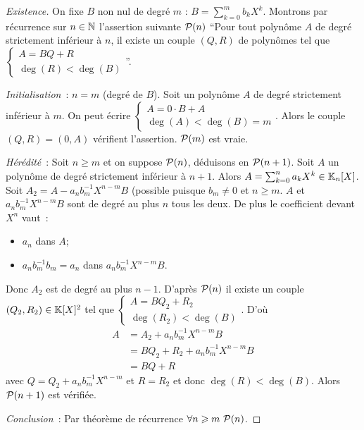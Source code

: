 \begin{proof}[Existence]
  On fixe \(B\) non nul de degré \(m\) : \(B = \sum_{k = 0}^m b_k X^k\). Montrons 
  par récurrence sur \(n \in \N\) l'assertion suivante \(\P(n)\) ``Pour tout 
  polynôme \(A\) de degré strictement inférieur à \(n\), il existe un couple 
  \((Q,R)\) de polynômes tel que \(\begin{cases} A = BQ+R \\ \deg(R) < 
  \deg(B)\end{cases}\)''.

  \emph{Initialisation}~: \(n = m\) (degré de \(B\)). Soit un polynôme \(A\) de 
  degré strictement inférieur à \(m\). On peut écrire \(\begin{cases} A = 0 \cdot 
  B+A \\ \deg(A) < \deg(B) = m\end{cases}\). Alors le couple \((Q,R) = (0,A)\) 
  vérifient l'assertion. \(\P(m)\) est vraie.

  \emph{Hérédité}~: Soit \(n \geqslant m\) et on suppose \(\P(n)\), déduisons en 
  \(\P(n+1)\). Soit \(A\) un polynôme de degré strictement inférieur à \(n+1\). 
  Alors \(A = \sum_{k = 0}^n a_k X^k \in \K_n[X]\). Soit \(A_2 = 
  A-a_nb_m^{-1}X^{n-m}B\) (possible puisque \(b_m \neq 0\) et \(n \geqslant m\). 
  \(A\) et \(a_nb_m^{-1}X^{n-m}B\) sont de degré au plus \(n\) tous les deux. De 
  plus le coefficient devant \(X^n\) vaut~:
  \begin{itemize}
    \item \(a_n\) dans \(A\);
    \item \(a_nb_m^{-1}b_m = a_n\) dans \(a_nb_m^{-1}X^{n-m}B\).
  \end{itemize}
  Donc \(A_2\) est de degré au plus \(n-1\). D'après \(\P(n)\) il existe un 
  couple \((Q_2,R_2) \in \K[X]^2\) tel que \(\begin{cases} A = BQ_2+R_2 \\ 
  \deg(R_2) < \deg(B)\end{cases}\). D'où
  \begin{align}
    A& = A_2 + a_n b_m^{-1}X^{n-m}B\\
    & = BQ_2+R_2 +a_n b_m^{-1}X^{n-m}B\\
    & = BQ+R
  \end{align}
  avec \(Q = Q_2+a_n b_m^{-1}X^{n-m}\) et \(R = R_2\) et donc \(\deg(R) < \deg(B)\). 
  Alors \(\P(n+1)\) est vérifiée.

  \emph{Conclusion}~: Par théorème de récurrence \(\forall n \geqslant m \ 
  \P(n)\).
\end{proof}

